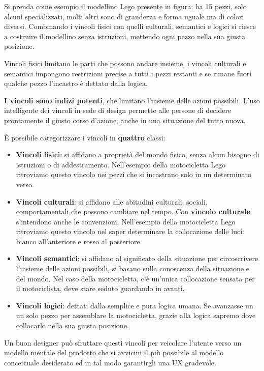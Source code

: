 \documentclass[a4paper,11pt,oneside]{book}
\begin{document}
Si prenda come esempio il modellino Lego presente in figura: ha 15 pezzi, solo alcuni specializzati, molti altri sono di grandezza e forma uguale ma di colori diversi. Combinando i vincoli fisici con quelli culturali, semantici e logici si riesce a costruire il modellino senza istruzioni, mettendo ogni pezzo nella sua giusta posizione.

Vincoli fisici limitano le parti che possono andare insieme, i vincoli culturali e semantici impongono restrizioni precise a tutti i pezzi restanti e se rimane fuori qualche pezzo l'incastro è dettato dalla logica.

\textbf{I vincoli sono indizi potenti}, che limitano l'insieme delle azioni possibili. L'uso intelligente dei vincoli in sede di design permette alle persone di decidere prontamente il giusto corso d'azione, anche in una situazione del tutto nuova.

\pagebreak

È possibile categorizzare i vincoli in \textbf{quattro} classi:
\begin{itemize}
	\item \textbf{Vincoli fisici}: si affidano a proprietà del mondo fisico, senza alcun bisogno di istruzioni o di addestramento. Nell'esempio della motocicletta Lego ritroviamo questo vincolo nei pezzi che si incastrano solo in un determinato verso.
	\item \textbf{Vincoli culturali}: si affidano alle abitudini culturali, sociali, comportamentali che possono cambiare nel tempo. Con \textbf{vincolo culturale} s'intendono anche le convenzioni. Nell'esempio della motocicletta Lego ritroviamo questo vincolo nel saper determinare la collocazione delle luci: bianco all'anteriore e rosso al posteriore.
	\item \textbf{Vincoli semantici}: si affidano al significato della situazione per circoscrivere l'insieme delle azioni possibili, si basano sulla conoscenza della situazione e del mondo. Nel caso della motocicletta, c'è un'unica collocazione sensata per il motociclista, deve stare seduto guardando in avanti.
	\item \textbf{Vincoli logici}: dettati dalla semplice e pura logica umana. Se avanzasse un un solo pezzo per assemblare la motocicletta, grazie alla logica sapremo dove collocarlo nella sua giusta posizione.
\end{itemize}

Un buon designer può sfruttare questi vincoli per veicolare l'utente verso un modello mentale del prodotto che si avvicini il più possibile al modello concettuale desiderato ed in tal modo garantirgli una UX gradevole.
\end{document}
